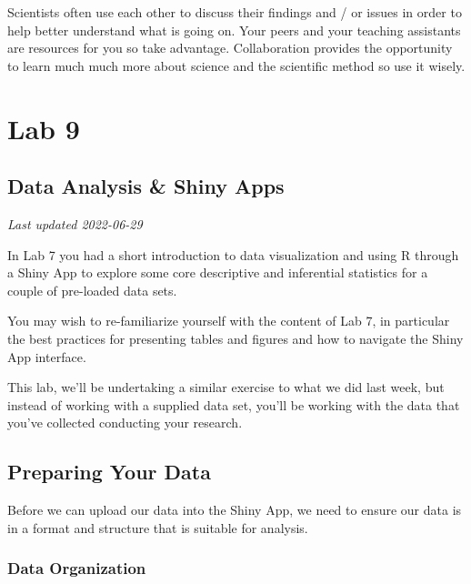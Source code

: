 \documentclass[
]{book}
\begin{document}
Scientists often use each other to discuss their findings and / or issues in order to help better understand what is going on. Your peers and your teaching assistants are resources for you so take advantage. Collaboration provides the opportunity to learn much much more about science and the scientific method so use it wisely.

\hypertarget{part-lab-9}{%
\part*{Lab 9}\label{part-lab-9}}

\hypertarget{data-analysis-shiny-apps}{%
\chapter*{Data Analysis \& Shiny Apps}\label{data-analysis-shiny-apps}}

\emph{Last updated 2022-06-29}

In Lab 7 you had a short introduction to data visualization and using R through a Shiny App to explore some core descriptive and inferential statistics for a couple of pre-loaded data sets.

You may wish to re-familiarize yourself with the content of Lab 7, in particular the best practices for presenting tables and figures and how to navigate the Shiny App interface.

This lab, we'll be undertaking a similar exercise to what we did last week, but instead of working with a supplied data set, you'll be working with the data that you've collected conducting your research.

\hypertarget{preparing-your-data}{%
\chapter*{Preparing Your Data}\label{preparing-your-data}}

Before we can upload our data into the Shiny App, we need to ensure our data is in a format and structure that is suitable for analysis.

\hypertarget{data-organization}{%
\section*{Data Organization}\label{data-organization}}
\end{document}
